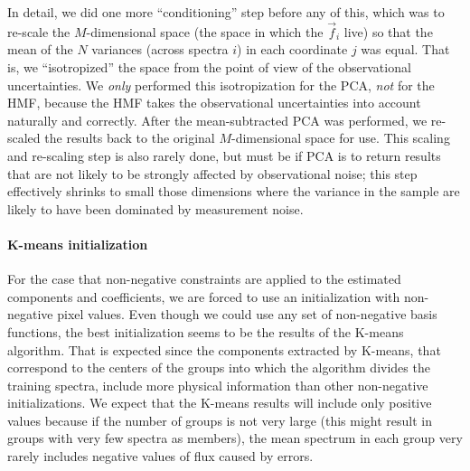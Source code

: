 \documentclass[12pt,preprint]{aastex}
\begin{document}
In detail, we did one more ``conditioning'' step before any of this,
which was to re-scale the $M$-dimensional space (the space in which
the $\vec{f}_i$ live) so that the mean of the $N$
variances (across spectra $i$) in each coordinate $j$ was
equal.  That is, we ``isotropized'' the space from the point of view
of the observational uncertainties.  We \emph{only} performed this
isotropization for the PCA, \emph{not} for the HMF, because the HMF
takes the observational uncertainties into account naturally and
correctly.  After the mean-subtracted PCA was performed, we re-scaled
the results back to the original $M$-dimensional space for use.  This
scaling and re-scaling step is also rarely done, but must be if PCA is
to return results that are not likely to be strongly affected by
observational noise; this step effectively shrinks to small those
dimensions where the variance in the sample are likely to have been
dominated by measurement noise.

\paragraph{K-means initialization}
For the case that non-negative constraints are applied to the
estimated components and coefficients, we are forced to use an
initialization with non-negative pixel values. Even though we could
use any set of non-negative basis functions, the best initialization
seems to be the results of the K-means algorithm. That is expected
since the components extracted by K-means, that correspond to the
centers of the groups into which the algorithm divides the training
spectra, include more physical information than other non-negative
initializations. We expect that the K-means results will include only
positive values because if the number of groups is not very large
(this might result in groups with very few spectra as members), the
mean spectrum in each group very rarely includes negative values of
flux caused by errors.
\end{document}
